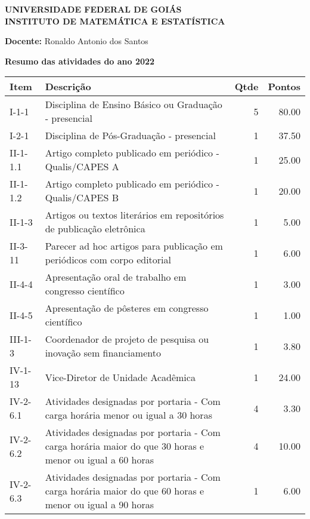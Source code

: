 \documentclass[11pt,a4paper]{article}
\begin{document}
\thispagestyle{empty}

\begin{center}
  \textbf{UNIVERSIDADE FEDERAL DE GOIÁS\\
  INSTITUTO DE MATEMÁTICA E ESTATÍSTICA}
\end{center}

\noindent\textbf{Docente:}
Ronaldo Antonio dos Santos

\begin{center}
\large \textbf{
Resumo das atividades do ano 2022
}
\end{center}
\vspace{-0.5cm}
\begin{table}[ht]
\centering
\begin{tabular}{|l|p{12cm}|r|r|}
  \hline
{\textbf{Item}} & {\textbf{Descrição}} & {\textbf{Qtde}} & {\textbf{Pontos}} \\ 
  \hline
I-1-1 & Disciplina de Ensino Básico ou Graduação - presencial &   5 & 80.00 \\ 
  I-2-1 & Disciplina de Pós-Graduação - presencial &   1 & 37.50 \\ 
  II-1-1.1 & Artigo completo publicado em periódico - Qualis/CAPES A &   1 & 25.00 \\ 
  II-1-1.2 & Artigo completo publicado em periódico - Qualis/CAPES B &   1 & 20.00 \\ 
  II-1-3 & Artigos ou textos literários em repositórios de publicação eletrônica &   1 & 5.00 \\ 
  II-3-11 & Parecer ad hoc artigos para publicação em periódicos com corpo editorial &   1 & 6.00 \\ 
  II-4-4 & Apresentação oral de trabalho em congresso científico &   1 & 3.00 \\ 
  II-4-5 & Apresentação de pôsteres em congresso científico &   1 & 1.00 \\ 
  III-1-3 & Coordenador de projeto de pesquisa ou inovação sem financiamento &   1 & 3.80 \\ 
  IV-1-13 & Vice-Diretor de Unidade Acadêmica &   1 & 24.00 \\ 
  IV-2-6.1 & Atividades designadas por portaria - Com carga horária menor ou igual a 30 horas &   4 & 3.30 \\ 
  IV-2-6.2 & Atividades designadas por portaria - Com carga horária maior do que 30 horas e menor ou igual a 60 horas &   4 & 10.00 \\ 
  IV-2-6.3 & Atividades designadas por portaria - Com carga horária maior do que 60 horas e menor ou igual a 90 horas &   1 & 6.00 \\ 

\end{tabular}
\end{table}
\end{document}
